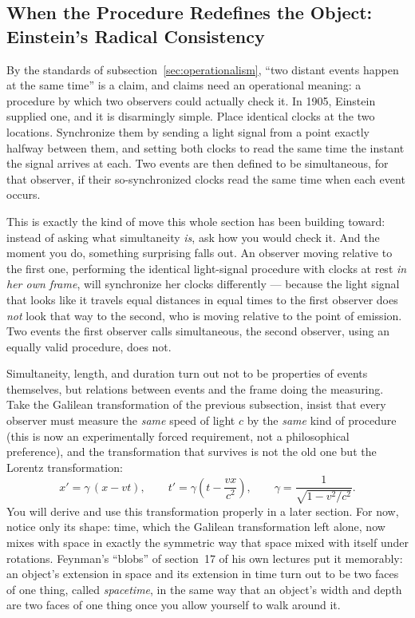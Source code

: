 \subsection[When the Procedure Redefines the Object]{When the Procedure Redefines the Object: Einstein's Radical Consistency}
\label{sec:einstein}

By the standards of subsection~\ref{sec:operationalism}, ``two distant events happen at the same time'' is a claim, and claims need an operational meaning: a procedure by which two observers could actually check it. In 1905, Einstein supplied one, and it is disarmingly simple. Place identical clocks at the two locations. Synchronize them by sending a light signal from a point exactly halfway between them, and setting both clocks to read the same time the instant the signal arrives at each. Two events are then defined to be simultaneous, for that observer, if their so-synchronized clocks read the same time when each event occurs.

This is exactly the kind of move this whole section has been building toward: instead of asking what simultaneity \emph{is}, ask how you would check it. And the moment you do, something surprising falls out. An observer moving relative to the first one, performing the identical light-signal procedure with clocks at rest \emph{in her own frame}, will synchronize her clocks differently --- because the light signal that looks like it travels equal distances in equal times to the first observer does \emph{not} look that way to the second, who is moving relative to the point of emission. Two events the first observer calls simultaneous, the second observer, using an equally valid procedure, does not.

Simultaneity, length, and duration turn out not to be properties of events themselves, but relations between events and the frame doing the measuring. Take the Galilean transformation of the previous subsection, insist that every observer must measure the \emph{same} speed of light $c$ by the \emph{same} kind of procedure (this is now an experimentally forced requirement, not a philosophical preference), and the transformation that survives is not the old one but the Lorentz transformation:
\[
  x' = \gamma\,(x - vt), \qquad t' = \gamma\left(t - \frac{vx}{c^2}\right), \qquad \gamma = \frac{1}{\sqrt{1 - v^2/c^2}}.
\]
You will derive and use this transformation properly in a later section. For now, notice only its shape: time, which the Galilean transformation left alone, now mixes with space in exactly the symmetric way that space mixed with itself under rotations. Feynman's ``blobs'' of section~17 of his own lectures put it memorably: an object's extension in space and its extension in time turn out to be two faces of one thing, called \emph{spacetime}, in the same way that an object's width and depth are two faces of one thing once you allow yourself to walk around it.

